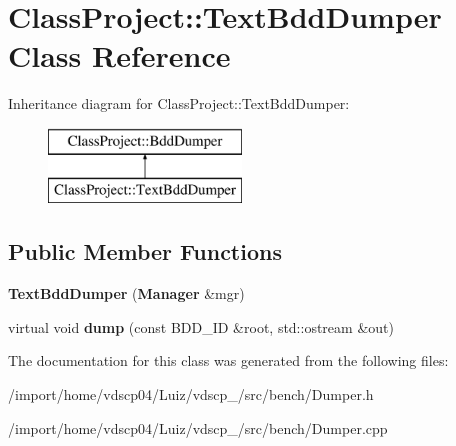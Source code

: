 \section{Class\+Project\+:\+:Text\+Bdd\+Dumper Class Reference}
\label{classClassProject_1_1TextBddDumper}
Inheritance diagram for Class\+Project\+:\+:Text\+Bdd\+Dumper\+:\begin{figure}[H]
\begin{center}
\leavevmode
\includegraphics[height=2.000000cm]{classClassProject_1_1TextBddDumper}
\end{center}
\end{figure}
\subsection*{Public Member Functions}
\begin{DoxyCompactItemize}
\item 
{\bfseries Text\+Bdd\+Dumper} ({\bf Manager} \&mgr)\label{classClassProject_1_1TextBddDumper_ae6d584f67f73ba58ac5a146e9921d2da}

\item 
virtual void {\bfseries dump} (const B\+D\+D\+\_\+\+ID \&root, std\+::ostream \&out)\label{classClassProject_1_1TextBddDumper_a24d38ffd14716206cb8d24937d06876e}

\end{DoxyCompactItemize}


The documentation for this class was generated from the following files\+:\begin{DoxyCompactItemize}
\item 
/import/home/vdscp04/\+Luiz/vdscp\+\_/src/bench/Dumper.\+h\item 
/import/home/vdscp04/\+Luiz/vdscp\+\_/src/bench/Dumper.\+cpp\end{DoxyCompactItemize}
